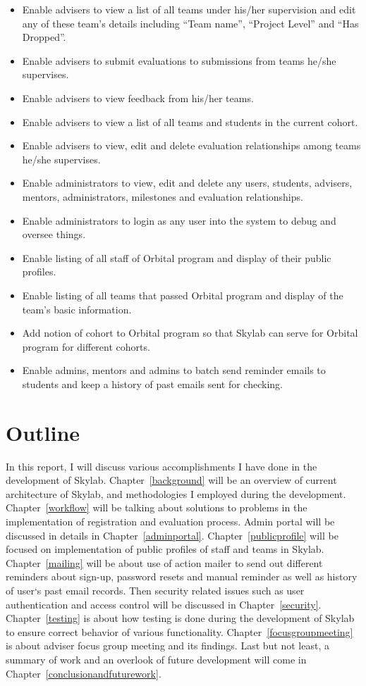 \begin{itemize}
  \item Enable advisers to view a list of all teams under his/her supervision and edit any of these team's details including ``Team name'', ``Project Level'' and ``Has Dropped''.
  \item Enable advisers to submit evaluations to submissions from teams he/she supervises.
  \item Enable advisers to view feedback from his/her teams.
  \item Enable advisers to view a list of all teams and students in the current cohort.
  \item Enable advisers to view, edit and delete evaluation relationships among teams he/she supervises.
  \item Enable administrators to view, edit and delete any users, students, advisers, mentors, administrators, milestones and evaluation relationships.
  \item Enable administrators to login as any user into the system to debug and oversee things.
  \item Enable listing of all staff of Orbital program and display of their public profiles.
  \item Enable listing of all teams that passed Orbital program and display of the team's basic information.
  \item Add notion of cohort to Orbital program so that Skylab can serve for Orbital program for different cohorts.
  \item Enable admins, mentors and admins to batch send reminder emails to students and keep a history of past emails sent for checking.
\end{itemize}

\section{Outline}

In this report, I will discuss various accomplishments I have done in the development of Skylab. Chapter~\ref{background} will be an overview of current architecture of Skylab, and methodologies I employed during the development. Chapter~\ref{workflow} will be talking about solutions to problems in the implementation of registration and evaluation process. Admin portal will be discussed in details in Chapter~\ref{adminportal}. Chapter~\ref{publicprofile} will be focused on implementation of public profiles of staff and teams in Skylab. Chapter~\ref{mailing} will be about use of action mailer to send out different reminders about sign-up, password resets and manual reminder as well as history of user`s past email records. Then security related issues such as user authentication and access control will be discussed in Chapter~\ref{security}. Chapter~\ref{testing} is about how testing is done during the development of Skylab to ensure correct behavior of various functionality. Chapter~\ref{focusgroupmeeting} is about adviser focus group meeting and its findings. Last but not least, a summary of work and an overlook of future development will come in Chapter~\ref{conclusionandfuturework}.
